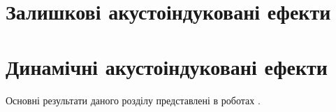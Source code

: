 \section{Залишкові акустоіндуковані ефекти}



\cite{Bahar2003,Ostap:PhotoLum,US:ZnSe,Zaver2007,ZobovFTP2008,RITTER2008,Wosinski,Ostapenko1999,Zaver,
Zaver:2008r,Ostrov2002FTPr,Ostrov2000FTPr,Vlasov2009r,Zaver2005,Davletova2008,Olikh:PZTF2006,Tagaev,
Teterkin2009r,PodolHivr,UST:OstrovCsI,YOlikh2007TPLr,Parchinskii2006r,Gorb2010,YOlikh2006TPLr,Parchinskii2000r,
YOlikhTPL2011r,Olikh:FTP2011,Olikh:SEMT2007,Zaveryukhin2002:2,YOlikh2005,RomanyukSST,ROMANYUK2005,Roman:2006JAP,
Roman:2007APL,Roman:2010JAP,YOlikh2010JL,US:FeSiC,Kuryliuk2009,Buscemi,Cuberes,Olikh:SPQEO2010}


%
%
%
%
%
%
%
%
%
%
%
%
%
%


\section{Динамічні акустоіндуковані ефекти}


Основні результати даного розділу представлені в роботах \cite{Olikh:SEMT2004,Olikh:SEMT2011,1UNCPS,2013Buk}.

